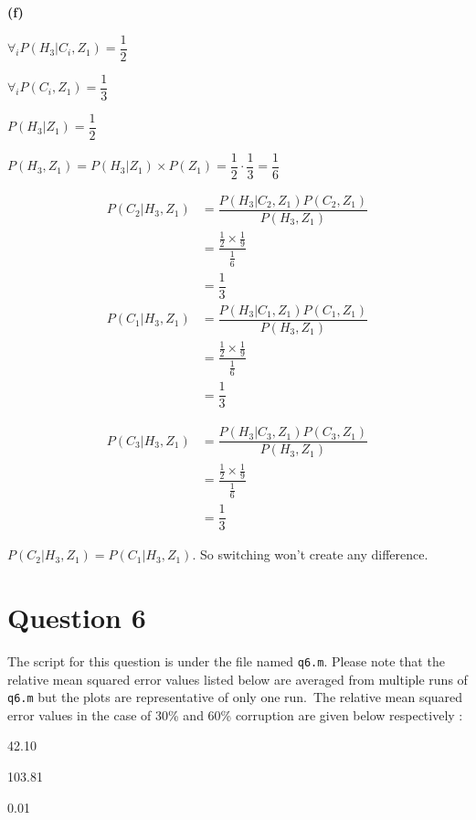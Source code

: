 \documentclass{article}
\theoremstyle{remark}
\begin{document}
\hspace{2.5em} \textbf{(f)}
\begin{center}
    $ \forall_i P(H_3|C_i,Z_1)=\dfrac{1}{2}$ \par
    $\forall_i P(C_i,Z_1)=\dfrac{1}{3}$ \par

    $P(H_3|Z_1)=\dfrac{1}{2}$ \par
    $P(H_3,Z_1)=P(H_3|Z_1) \times P(Z_1)=\dfrac{1}{2} \cdot \dfrac{1}{3}=\dfrac{1}{6} $ \par
    \begin{align*}
        P(C_2|H_3,Z_1) & = \dfrac{P(H_3|C_2,Z_1)P(C_2,Z_1)}{P(H_3,Z_1)}        \\
                       & = \dfrac{\frac{1}{2} \times \frac{1}{9}}{\frac{1}{6}} \\
                       & = \dfrac{1}{3}
    \end{align*}
    \begin{align*}
        P(C_1|H_3,Z_1) & = \dfrac{P(H_3|C_1,Z_1)P(C_1,Z_1)}{P(H_3,Z_1)}       \\
                       & =\dfrac{\frac{1}{2} \times \frac{1}{9}}{\frac{1}{6}} \\
                       & = \dfrac{1}{3}
    \end{align*}

    \begin{align*}
        P(C_3|H_3,Z_1) & = \dfrac{P(H_3|C_3,Z_1)P(C_3,Z_1)}{P(H_3,Z_1)}       \\
                       & =\dfrac{\frac{1}{2} \times \frac{1}{9}}{\frac{1}{6}} \\
                       & = \dfrac{1}{3}
    \end{align*}

    $P(C_2|H_3,Z_1) = P(C_1|H_3,Z_1)$. So switching won't create any difference.



\end{center}





\newpage



\section{Question 6}
The script for this question is under the file named \texttt{q6.m}.
Please note that the relative mean squared error values listed below are averaged from multiple runs of \texttt{q6.m} but the plots are representative of only one run.\
The relative mean squared error values in the case of 30\% and 60\% corruption are given below respectively :
\begin{description}[noitemsep]
    \item [Moving Median Filtering]\hspace{0.1em} 42.10
    \item [Moving Mean Filtering]\hspace{0.2em} 103.81
    \item [Moving Quartile Filtering]  0.01
\end{description}
\end{document}
